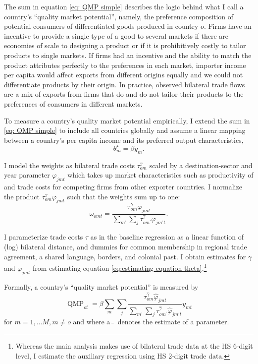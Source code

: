 \documentclass[12pt,a4paper,oneside,times]{article}   	%
\DeclareMathOperator{\MP}{QMP}
\begin{document}
The sum in equation \eqref{eq: QMP simple} describes the logic behind what I call a country's ``quality market potential'', namely, the preference composition of  potential consumers of differentiated goods produced in country $o$. Firms have an incentive to provide a single type of a good to several markets if there are economies of scale to designing a product or if it is prohibitively costly to tailor products to single markets. If firms had an incentive and the ability to match the product attributes perfectly to the preferences in each market, importer income per capita would affect exports from different origins equally and we could not differentiate products by their origin.  
In practice, observed bilateral trade flows are a mix of exports from firms that do and do not tailor their products  to the preferences of consumers in different markets. 


To measure a country's quality market potential empirically, I extend the sum in \eqref{eq: QMP simple} to include all countries globally and assume a linear mapping between a country's per capita income and its preferred output characteristics, $$\theta_m^\star = \beta y_m.$$ 


I model the weights as bilateral trade costs $\tau^\gamma_{om}$ scaled by a destination-sector and year parameter $\varphi_{jmt}$ which takes up market characteristics such as productivity of and trade costs for competing firms from other exporter countries. I normalize the product $\tau^\gamma_{om} \varphi_{jmt}$ such that the weights sum up to one:
\begin{equation}
\omega_{omt} = \frac{\tau^\gamma_{om} \varphi_{jmt}}{\sum_{m^\prime}\sum_j{\tau^\gamma_{om^\prime}\varphi_{jm^\prime t}}}.
\end{equation}

I parameterize trade costs $\tau$ as in the baseline regression as a linear function of (log) bilateral distance, and dummies for common membership in regional trade agreement, a shared language, borders, and colonial past. I obtain estimates for $\gamma$ and $\varphi_{jmt}$ from estimating equation \eqref{eq:estimating equation theta}.\footnote{Whereas the main analysis makes use of bilateral trade data at the HS 6-digit level, I estimate the auxiliary regression using HS 2-digit trade data. %
}   

Formally, a country's ``quality market potential'' is measured by
\begin{equation}\label{eq: QMP definition}
\MP_{ot} = \beta \sum_m \sum_j \frac{\tau^{\hat{\gamma}}_{om} \hat{\varphi}_{jmt}}{\sum_{m^\prime}\sum_j {\tau^{\hat{\gamma}}_{om^\prime}\hat{\varphi}_{jm^\prime t}}} y_{mt}
\end{equation}
for $m=1,...M, m\neq o$ and where a $~\hat{}~$ denotes the estimate of a parameter. 
\end{document}
